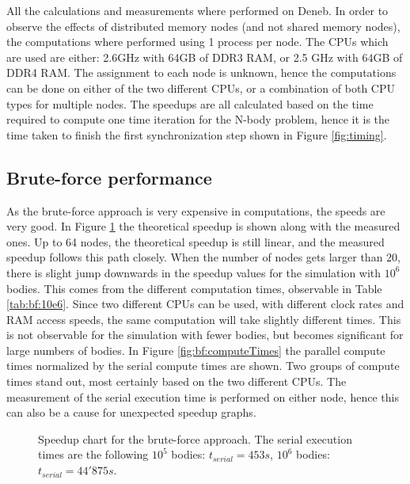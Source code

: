 All the calculations and measurements where performed on Deneb. In order to observe the effects of distributed memory nodes (and not shared memory nodes), the computations where performed using 1 process per node. The CPUs which are used are either: 2.6GHz with 64GB of DDR3 RAM, or 2.5 GHz with 64GB of DDR4 RAM. The assignment to each node is unknown, hence the computations can be done on either of the two different CPUs, or a combination of both CPU types for multiple nodes. The speedups are all calculated based on the time required to compute one time iteration for the N-body problem, hence it is the time taken to finish the first synchronization step shown in Figure \ref{fig:timing}.\\
\subsection{Brute-force performance}
As the brute-force approach is very expensive in computations, the speeds are very good. In Figure \ref{fig:speedup:bf} the theoretical speedup is shown along with the measured ones. Up to 64 nodes, the theoretical speedup is still linear, and the measured speedup follows this path closely. When the number of nodes gets larger than 20, there is slight jump downwards in the speedup values for the simulation with $10^6$ bodies. This comes from the different computation times, observable in Table \ref{tab:bf:10e6}. Since two different CPUs can be used, with different clock rates and RAM access speeds, the same computation will take slightly different times. This is not observable for the simulation with fewer bodies, but becomes significant for large numbers of bodies. In Figure \ref{fig:bf:computeTimes} the parallel compute times normalized by the serial compute times are shown. Two groups of compute times stand out, most certainly based on the two different CPUs. The measurement of the serial execution time is performed on either node, hence this can also be a cause for unexpected speedup graphs.\\

\begin{figure}
\centering

\caption{Speedup chart for the brute-force approach. The serial execution times are the following $10^5$ bodies: $t_{serial} = 453s$, $10^6$ bodies: $t_{serial} = 44'875s$.}
\label{fig:speedup:bf}
\end{figure}


